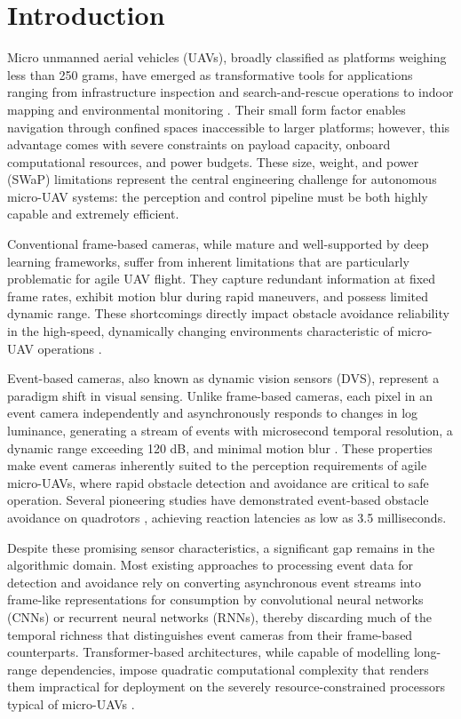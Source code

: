\documentclass[11pt, a4paper]{report}
\begin{document}
\chapter{Introduction}
Micro unmanned aerial vehicles (UAVs), broadly classified as platforms weighing less than 250 grams, have emerged as transformative tools for applications ranging from infrastructure inspection and search-and-rescue operations to indoor mapping and environmental monitoring \cite{floreano2015science}. Their small form factor enables navigation through confined spaces inaccessible to larger platforms; however, this advantage comes with severe constraints on payload capacity, onboard computational resources, and power budgets. These size, weight, and power (SWaP) limitations represent the central engineering challenge for autonomous micro-UAV systems: the perception and control pipeline must be both highly capable and extremely efficient.

Conventional frame-based cameras, while mature and well-supported by deep learning frameworks, suffer from inherent limitations that are particularly problematic for agile UAV flight. They capture redundant information at fixed frame rates, exhibit motion blur during rapid maneuvers, and possess limited dynamic range. These shortcomings directly impact obstacle avoidance reliability in the high-speed, dynamically changing environments characteristic of micro-UAV operations \cite{gallego2020event}. 

Event-based cameras, also known as dynamic vision sensors (DVS), represent a paradigm shift in visual sensing. Unlike frame-based cameras, each pixel in an event camera independently and asynchronously responds to changes in log luminance, generating a stream of events with microsecond temporal resolution, a dynamic range exceeding 120 dB, and minimal motion blur \cite{gallego2020event}. These properties make event cameras inherently suited to the perception requirements of agile micro-UAVs, where rapid obstacle detection and avoidance are critical to safe operation. Several pioneering studies have demonstrated event-based obstacle avoidance on quadrotors \cite{falanga2019fast}, \cite{sanket2020evdodgenet} achieving reaction latencies as low as 3.5 milliseconds. 

Despite these promising sensor characteristics, a significant gap remains in the algorithmic domain. Most existing approaches to processing event data for detection and avoidance rely on converting asynchronous event streams into frame-like representations for consumption by convolutional neural networks (CNNs) or recurrent neural networks (RNNs), thereby discarding much of the temporal richness that distinguishes event cameras from their frame-based counterparts. Transformer-based architectures, while capable of modelling long-range dependencies, impose quadratic computational complexity that renders them impractical for deployment on the severely resource-constrained processors typical of micro-UAVs \cite{vaswani2017attention}. 
\end{document}
